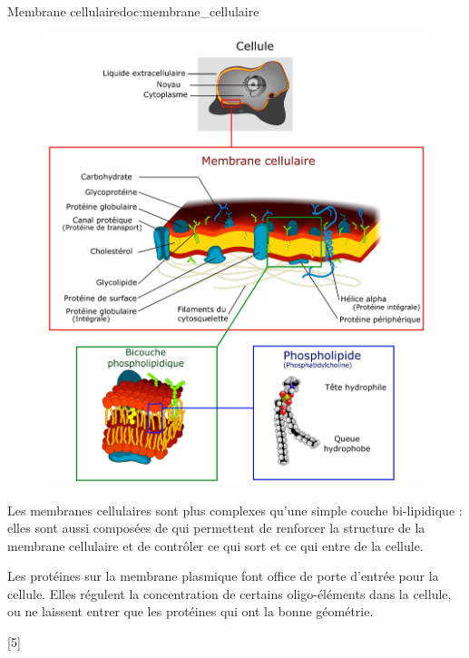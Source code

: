 \begin{doc}{Membrane cellulaire}{doc:membrane_cellulaire}
  \begin{figure}
    \centering
    \vspace*{-36pt}
    \includegraphics[width=0.9\linewidth]{images/proteines/cellule_membrane_lipide.png}
  \end{figure}
  Les membranes cellulaires sont plus complexes qu'une simple couche bi-lipidique : elles sont aussi composées de  qui permettent de renforcer la structure de la membrane cellulaire et de contrôler ce qui sort et ce qui entre de la cellule.
  \bigskip

  Les protéines sur la membrane plasmique font office de porte d'entrée pour la cellule. 
  Elles régulent la concentration de certains oligo-éléments dans la cellule, ou ne laissent entrer que les protéines qui ont la bonne géométrie.

  \vspace{2.2cm}
  \phantom{b}

\end{doc}

[5]
